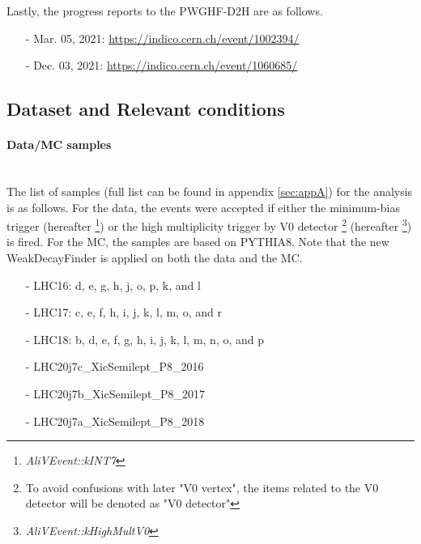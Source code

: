 Lastly, the progress reports to the PWGHF-D2H are as follows.
%
\begin{itemize}
    \small
    \item[]  \vspace{1pt}
    \item[-] Mar. 05, 2021: \url{https://indico.cern.ch/event/1002394/}
    \item[-] Dec. 03, 2021: \url{https://indico.cern.ch/event/1060685/}
\end{itemize}

\clearpage

\subsection{Dataset and Relevant conditions}\label{subsec:dataset}

\vspace{\columnsep}
\paragraph{Data/MC samples}\mbox{}\\
The list of samples (full list can be found in appendix \ref{sec:appA}) for the analysis is as follows. For the  \TeV data, the events were accepted if either the minimum-bias trigger (hereafter  \footnote{\textit{AliVEvent::kINT7}}) or the high multiplicity trigger by V0 detector \footnote{To avoid confusions with later "V0 vertex", the items related to the V0 detector will be denoted as "V0 detector"} (hereafter  \footnote{\textit{AliVEvent::kHighMultV0}}) is fired. For the MC, the samples are based on PYTHIA8. Note that the new WeakDecayFinder \cite{JiraTicket} is applied on both the data and the MC.
%
\begin{itemize}
    \small
    \item[]  \vspace{1pt}
    \item[-] LHC16: d, e, g, h, j, o, p, k, and l
    \item[-] LHC17: c, e, f, h, i, j, k, l, m, o, and r
    \item[-] LHC18: b, d, e, f, g, h, i, j, k, l, m, n, o, and p
    \vspace{\columnsep}
    \item[]  \vspace{1pt}
    \item[-] LHC20j7c\_XicSemilept\_P8\_2016
    \item[-] LHC20j7b\_XicSemilept\_P8\_2017
    \item[-] LHC20j7a\_XicSemilept\_P8\_2018
\end{itemize}

